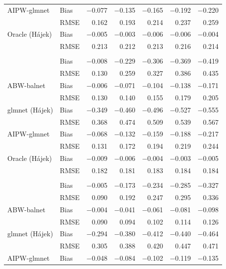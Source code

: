 \documentclass[
  12pt,
  a4paper,
]{article}
\makeatletter
\renewenvironment{atbl}{\par\if@nobreak\else\Needspace*{6\baselineskip}\fi\def\@captype{atbl}\def\fps@table{H}}{\par}%
\makeatother
\begin{document}
\begin{atbl}
{\begin{longtable*}{llrrrrr}
{AIPW-glmnet} & {Bias} & {−0.077} & {−0.135} & {−0.165} & {−0.192} & {−0.220} \\ 
{} & {RMSE} & {0.162} & {0.193} & {0.214} & {0.237} & {0.259} \\ 
{Oracle (Hájek)} & {Bias} & {−0.005} & {−0.003} & {−0.006} & {−0.006} & {−0.004} \\ 
{} & {RMSE} & {0.213} & {0.212} & {0.213} & {0.216} & {0.214} \\ 
\midrule\addlinespace[2.5pt]
 \\[2.5pt] 
\midrule{} & {Bias} & {−0.008} & {−0.229} & {−0.306} & {−0.369} & {−0.419} \\ 
{} & {RMSE} & {0.130} & {0.259} & {0.327} & {0.386} & {0.435} \\ 
{ABW-balnet} & {Bias} & {−0.006} & {−0.071} & {−0.104} & {−0.138} & {−0.171} \\ 
{} & {RMSE} & {0.130} & {0.140} & {0.155} & {0.179} & {0.205} \\ 
{glmnet (Hájek)} & {Bias} & {−0.349} & {−0.460} & {−0.496} & {−0.527} & {−0.555} \\ 
{} & {RMSE} & {0.368} & {0.474} & {0.509} & {0.539} & {0.567} \\ 
{AIPW-glmnet} & {Bias} & {−0.068} & {−0.132} & {−0.159} & {−0.188} & {−0.217} \\ 
{} & {RMSE} & {0.131} & {0.172} & {0.194} & {0.219} & {0.244} \\ 
{Oracle (Hájek)} & {Bias} & {−0.009} & {−0.006} & {−0.004} & {−0.003} & {−0.005} \\ 
{} & {RMSE} & {0.182} & {0.181} & {0.183} & {0.184} & {0.184} \\ 
\midrule\addlinespace[2.5pt]
 \\[2.5pt] 
\midrule{} & {Bias} & {−0.005} & {−0.173} & {−0.234} & {−0.285} & {−0.327} \\ 
{} & {RMSE} & {0.090} & {0.192} & {0.247} & {0.295} & {0.336} \\ 
{ABW-balnet} & {Bias} & {−0.004} & {−0.041} & {−0.061} & {−0.081} & {−0.098} \\ 
{} & {RMSE} & {0.090} & {0.094} & {0.102} & {0.114} & {0.126} \\ 
{glmnet (Hájek)} & {Bias} & {−0.294} & {−0.380} & {−0.412} & {−0.440} & {−0.464} \\ 
{} & {RMSE} & {0.305} & {0.388} & {0.420} & {0.447} & {0.471} \\ 
{AIPW-glmnet} & {Bias} & {−0.048} & {−0.084} & {−0.102} & {−0.119} & {−0.135} \\ 

\end{longtable*}}
\end{atbl}
\end{document}
